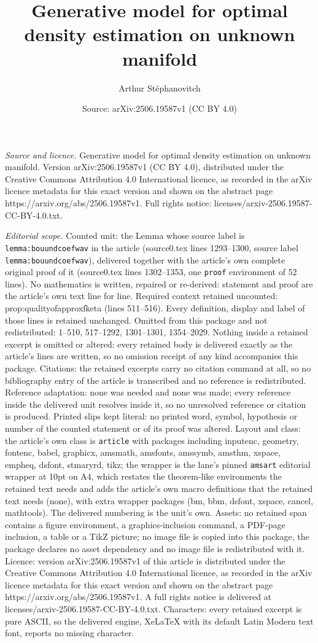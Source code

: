 \documentclass[10pt,a4paper]{amsart}
\title[Generative model for optimal density estimation on unknown m]{Generative model for optimal density estimation on unknown manifold}
\author{Arthur St\'ephanovitch}
\date{Source: arXiv:2506.19587v1 (CC BY 4.0)}
\begin{document}
\maketitle

\noindent\emph{Source and licence.} Generative model for optimal density estimation on unknown manifold. Version arXiv:2506.19587v1 (CC BY 4.0), distributed under the Creative Commons Attribution 4.0 International licence, as recorded in the arXiv licence metadata for this exact version and shown on the abstract page https://arxiv.org/abs/2506.19587v1. Full rights notice: licenses/arxiv-2506.19587-CC-BY-4.0.txt.\par\smallskip

\noindent\textit{Editorial scope.} Counted unit: the Lemma whose source label is \texttt{lemma:bouundcoefwav} in the article (source0.tex lines 1293--1300, source label \texttt{lemma:bouundcoefwav}), delivered together with the article's own complete original proof of it (source0.tex lines 1302--1353, one \texttt{proof} environment of 52 lines). No mathematics is written, repaired or re-derived: statement and proof are the article's own text line for line. Required context retained uncounted: prop:qualityofapproxfketa (lines 511--516). Every definition, display and label of those lines is retained unchanged. Omitted from this package and not redistributed: 1--510, 517--1292, 1301--1301, 1354--2029. Nothing inside a retained excerpt is omitted or altered: every retained body is delivered exactly as the article's lines are written, so no omission receipt of any kind accompanies this package. Citations: the retained excerpts carry no citation command at all, so no bibliography entry of the article is transcribed and no reference is redistributed. Reference adaptation: none was needed and none was made; every reference inside the delivered unit resolves inside it, so no unresolved reference or citation is produced. Printed slips kept literal: no printed word, symbol, hypothesis or number of the counted statement or of its proof was altered. Layout and class: the article's own class is \texttt{article} with packages including inputenc, geometry, fontenc, babel, graphicx, amsmath, amsfonts, amssymb, amsthm, xspace, empheq, dsfont, stmaryrd, tikz; the wrapper is the lane's pinned \texttt{amsart} editorial wrapper at 10pt on A4, which restates the theorem-like environments the retained text needs and adds the article's own macro definitions that the retained text needs (none), with extra wrapper packages (bm, bbm, dsfont, xspace, cancel, mathtools). The delivered numbering is the unit's own. Assets: no retained span contains a figure environment, a graphics-inclusion command, a PDF-page inclusion, a table or a TikZ picture; no image file is copied into this package, the package declares no asset dependency and no image file is redistributed with it. Licence: version arXiv:2506.19587v1 of this article is distributed under the Creative Commons Attribution 4.0 International licence, as recorded in the arXiv licence metadata for this exact version and shown on the abstract page https://arxiv.org/abs/2506.19587v1. A full rights notice is delivered at licenses/arxiv-2506.19587-CC-BY-4.0.txt. Characters: every retained excerpt is pure ASCII, so the delivered engine, XeLaTeX with its default Latin Modern text font, reports no missing character.
\end{document}
